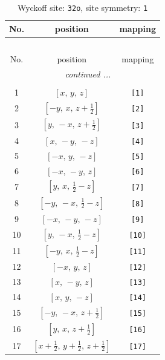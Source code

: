 \documentclass[fleqn,8pt]{jsarticle}
\begin{document}
\renewcommand{\arraystretch}{1.2}
\begin{longtable}{ccc}
\caption{Wyckoff site: {\tt 32o}, site symmetry: {\tt 1}}
 \\
 \hline \hline
No. & position & mapping \\ \hline \endfirsthead

\multicolumn{2}{l}{\tablename\ \thetable{}} \\
 \hline \hline
No. & position & mapping \\ \hline \endhead

 \hline \hline
\multicolumn{2}{r}{\footnotesize\it continued ...} \\ \endfoot

 \hline \hline
\multicolumn{2}{r}{} \\ \endlastfoot

1 & $\left[ x,\, y,\, z \right]$ & {\tt [1]} \\ \hline
2 & $\left[ - y,\, x,\, z + \frac{1}{2} \right]$ & {\tt [2]} \\ \hline
3 & $\left[ y,\, - x,\, z + \frac{1}{2} \right]$ & {\tt [3]} \\ \hline
4 & $\left[ x,\, - y,\, - z \right]$ & {\tt [4]} \\ \hline
5 & $\left[ - x,\, y,\, - z \right]$ & {\tt [5]} \\ \hline
6 & $\left[ - x,\, - y,\, z \right]$ & {\tt [6]} \\ \hline
7 & $\left[ y,\, x,\, \frac{1}{2} - z \right]$ & {\tt [7]} \\ \hline
8 & $\left[ - y,\, - x,\, \frac{1}{2} - z \right]$ & {\tt [8]} \\ \hline
9 & $\left[ - x,\, - y,\, - z \right]$ & {\tt [9]} \\ \hline
10 & $\left[ y,\, - x,\, \frac{1}{2} - z \right]$ & {\tt [10]} \\ \hline
11 & $\left[ - y,\, x,\, \frac{1}{2} - z \right]$ & {\tt [11]} \\ \hline
12 & $\left[ - x,\, y,\, z \right]$ & {\tt [12]} \\ \hline
13 & $\left[ x,\, - y,\, z \right]$ & {\tt [13]} \\ \hline
14 & $\left[ x,\, y,\, - z \right]$ & {\tt [14]} \\ \hline
15 & $\left[ - y,\, - x,\, z + \frac{1}{2} \right]$ & {\tt [15]} \\ \hline
16 & $\left[ y,\, x,\, z + \frac{1}{2} \right]$ & {\tt [16]} \\ \hline
17 & $\left[ x + \frac{1}{2},\, y + \frac{1}{2},\, z + \frac{1}{2} \right]$ & {\tt [17]} \\ \hline

\end{longtable}
\end{document}
